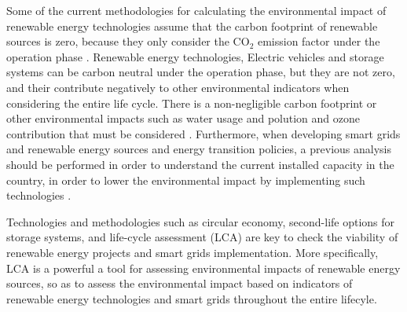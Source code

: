 Some of the current methodologies for calculating the environmental impact of renewable energy technologies assume that the carbon footprint of renewable sources is zero, because they only consider the CO$_2$ emission factor under the operation phase \cite{IRENA2020}. Renewable energy technologies, Electric vehicles and storage systems can be carbon neutral under the operation phase, but they are not zero, and their contribute negatively to other environmental indicators when considering the entire life cycle. There is a non-negligible carbon footprint or other environmental impacts such as water usage and polution and ozone contribution that must be considered \cite{en12214214, Moro2017, Jiang2018}. Furthermore, when developing smart grids and renewable energy sources and energy transition policies, a previous analysis should be performed in order to understand the current installed capacity in the country, in order to lower the environmental impact by implementing such technologies \cite{Treyer2014}.
%

Technologies and methodologies such as circular economy, second-life options for storage systems, and life-cycle assessment (LCA) are key to check the viability of renewable energy projects and smart grids implementation. More specifically, LCA is a powerful a tool for assessing environmental impacts of renewable energy sources, so as to assess the environmental impact based on indicators of renewable energy technologies and smart grids throughout the entire lifecyle. 



\newpage 

